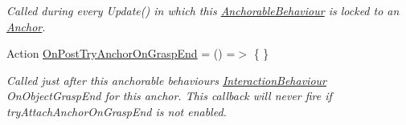 \begin{DoxyCompactItemize}
\begin{DoxyCompactList}\small\item\em Called during every Update() in which this \mbox{\hyperlink{class_leap_1_1_unity_1_1_interaction_1_1_anchorable_behaviour}{Anchorable\+Behaviour}} is locked to an \mbox{\hyperlink{class_leap_1_1_unity_1_1_interaction_1_1_anchor}{Anchor}}. \end{DoxyCompactList}\item 
Action \mbox{\hyperlink{class_leap_1_1_unity_1_1_interaction_1_1_anchorable_behaviour_a29a27e344ab1105d4fa8657de3fe5dab}{On\+Post\+Try\+Anchor\+On\+Grasp\+End}} = () =$>$ \{ \}
\begin{DoxyCompactList}\small\item\em Called just after this anchorable behaviour\textquotesingle{}s \mbox{\hyperlink{class_leap_1_1_unity_1_1_interaction_1_1_interaction_behaviour}{Interaction\+Behaviour}} On\+Object\+Grasp\+End for this anchor. This callback will never fire if try\+Attach\+Anchor\+On\+Grasp\+End is not enabled. \end{DoxyCompactList}\end{DoxyCompactItemize}
